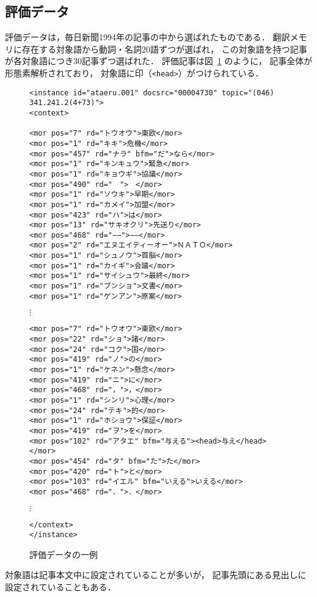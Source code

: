 \subsection{評価データ}
評価データは，毎日新聞1994年の記事の中から選ばれたものである．
翻訳メモリに存在する対象語から動詞・名詞20語ずつが選ばれ，
この対象語を持つ記事が各対象語につき30記事ずつ選ばれた．
評価記事は図~\ref{fig:eval_entry} のように，
記事全体が形態素解析されており，
対象語に印（\verb|<head>|）がつけられている．
\begin{figure}[tp]
 \begin{center}
  \begin{minipage}{.8\textwidth}
   \footnotesize
   \begin{verbatim}
<instance id="ataeru.001" docsrc="00004730" topic="(046) 341.241.2(4+73)">
<context>

<mor pos="7" rd="トウオウ">東欧</mor>
<mor pos="1" rd="キキ">危機</mor>
<mor pos="457" rd="ナラ" bfm="だ">なら</mor>
<mor pos="1" rd="キンキュウ">緊急</mor>
<mor pos="1" rd="キョウギ">協議</mor>
<mor pos="490" rd="　">　</mor>
<mor pos="1" rd="ソウキ">早期</mor>
<mor pos="1" rd="カメイ">加盟</mor>
<mor pos="423" rd="ハ">は</mor>
<mor pos="13" rd="サキオクリ">先送り</mor>
<mor pos="468" rd="−−">−−</mor>
<mor pos="2" rd="エヌエイティーオー">ＮＡＴＯ</mor>
<mor pos="1" rd="シュノウ">首脳</mor>
<mor pos="1" rd="カイギ">会議</mor>
<mor pos="1" rd="サイシュウ">最終</mor>
<mor pos="1" rd="ブンショ">文書</mor>
<mor pos="1" rd="ゲンアン">原案</mor>
   \end{verbatim}
   \vspace*{-1.5\baselineskip}
   \hspace*{5em}$\vdots$
   \vspace*{-.5\baselineskip}
   \begin{verbatim}
<mor pos="7" rd="トウオウ">東欧</mor>
<mor pos="22" rd="ショ">諸</mor>
<mor pos="24" rd="コク">国</mor>
<mor pos="419" rd="ノ">の</mor>
<mor pos="1" rd="ケネン">懸念</mor>
<mor pos="419" rd="ニ">に</mor>
<mor pos="468" rd="，">，</mor>
<mor pos="1" rd="シンリ">心理</mor>
<mor pos="24" rd="テキ">的</mor>
<mor pos="1" rd="ホショウ">保証</mor>
<mor pos="419" rd="ヲ">を</mor>
<mor pos="102" rd="アタエ" bfm="与える"><head>与え</head></mor>
<mor pos="454" rd="タ" bfm="た">た</mor>
<mor pos="420" rd="ト">と</mor>
<mor pos="103" rd="イエル" bfm="いえる">いえる</mor>
<mor pos="468" rd="．">．</mor>
   \end{verbatim}
   \vspace*{-1.5\baselineskip}
   \hspace*{5em}$\vdots$
   \vspace*{-.5\baselineskip}
   \begin{verbatim}
</context>
</instance>
   \end{verbatim}
  \end{minipage}
 \end{center}
 \caption{評価データの一例}
 \label{fig:eval_entry}
\end{figure}
対象語は記事本文中に設定されていることが多いが，
記事先頭にある見出しに設定されていることもある．


